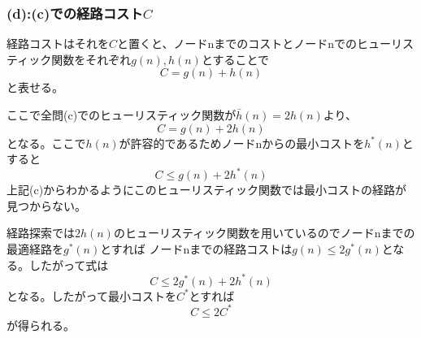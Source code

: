 \documentclass[a4paper,11pt,dvipdfmx]{jsarticle}
\begin{document}
\subsubsection{(d):(c)での経路コスト$C$}
経路コストはそれを$C$と置くと、ノードnまでのコストとノードnでのヒューリスティック関数をそれぞれ$g(n),h(n)$とすることで
\begin{equation*}
    C = g(n) + h(n) 
\end{equation*}
と表せる。

ここで全問(c)でのヒューリスティック関数が$\bar{h}(n)=2h(n)$より、
\begin{equation*}
    C = g(n) + 2h(n) 
\end{equation*}
となる。ここで$h(n)$が許容的であるためノードnからの最小コストを$h^*(n)$とすると
\begin{equation*}
    C \leq g(n) + 2h^*(n) 
\end{equation*}
上記(c)からわかるようにこのヒューリスティック関数では最小コストの経路が見つからない。

経路探索では$2h(n)$のヒューリスティック関数を用いているのでノードnまでの最適経路を$g^*(n)$とすれば
ノードnまでの経路コストは$g(n) \leq 2g^*(n)$となる。したがって式は
\begin{equation*}
    C \leq 2g^*(n) + 2h^*(n) 
\end{equation*}
となる。したがって最小コストを$C^*$とすれば
\begin{equation*}
    C \leq 2C^*
\end{equation*}
が得られる。
\end{document}
